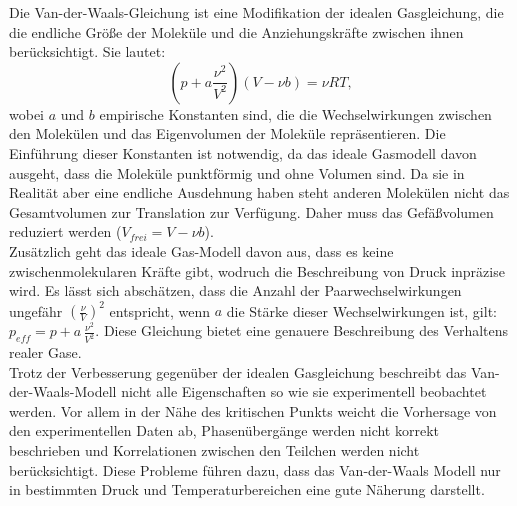     Die Van-der-Waals-Gleichung ist eine Modifikation der idealen Gasgleichung, die die endliche Größe der Moleküle und die Anziehungskräfte zwischen ihnen berücksichtigt. 
    Sie lautet:
    \begin{equation}
        \left( p + a \frac{\nu^2}{V^2} \right) (V - \nu b) = \nu RT,
        \label{eq:VanDerWaals}
    \end{equation}
    wobei \(a\) und \(b\) empirische Konstanten sind, die die Wechselwirkungen zwischen den Molekülen und das Eigenvolumen der Moleküle repräsentieren.
    Die Einführung dieser Konstanten ist notwendig, da das ideale Gasmodell davon ausgeht, dass die Moleküle punktförmig und ohne Volumen sind. 
    Da sie in Realität aber eine endliche Ausdehnung haben steht anderen Molekülen nicht das Gesamtvolumen zur Translation zur Verfügung. Daher muss das Gefäßvolumen reduziert werden ($V_{frei} = V-\nu b$).\\
    Zusätzlich geht das ideale Gas-Modell davon aus, dass es keine zwischenmolekularen Kräfte gibt, wodruch die Beschreibung von Druck inpräzise wird. 
    Es lässt sich abschätzen, dass die Anzahl der Paarwechselwirkungen ungefähr $(\frac{\nu}{V})^2$ entspricht, wenn $a$ die Stärke dieser Wechselwirkungen ist, gilt: $p_{eff} = p + a \, \frac{\nu^2}{V^2}$.
    Diese Gleichung bietet eine genauere Beschreibung des Verhaltens realer Gase.\\
    Trotz der Verbesserung gegenüber der idealen Gasgleichung beschreibt das Van-der-Waals-Modell nicht alle Eigenschaften so wie sie experimentell beobachtet werden. 
    Vor allem in der Nähe des kritischen Punkts weicht die Vorhersage von den experimentellen Daten ab, Phasenübergänge werden nicht korrekt beschrieben und Korrelationen zwischen den Teilchen werden nicht berücksichtigt.
    Diese Probleme führen dazu, dass das Van-der-Waals Modell nur in bestimmten Druck und Temperaturbereichen eine gute Näherung darstellt. 
    